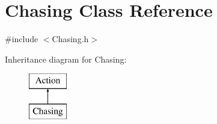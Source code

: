 \hypertarget{class_chasing}{}\section{Chasing Class Reference}
\label{class_chasing}


{\ttfamily \#include $<$Chasing.\+h$>$}

Inheritance diagram for Chasing\+:\begin{figure}[H]
\begin{center}
\leavevmode
\includegraphics[height=2.000000cm]{class_chasing}
\end{center}
\end{figure}
